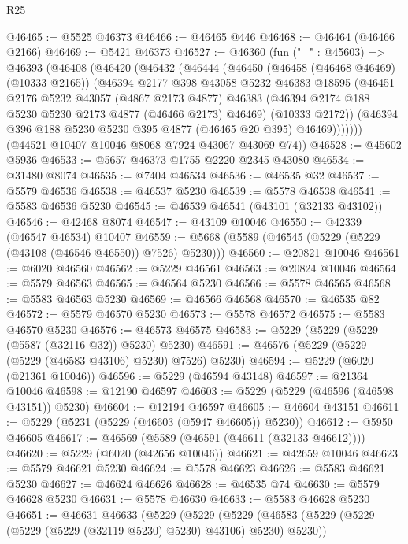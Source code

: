 \begin{lexlean}{R25}
\begin{coremodule}
@46465 := @5525 @46373
@46466 := @46465 @446
@46468 := @46464 (@46466 @2166)
@46469 := @5421 @46373
@46527 := @46360
    (fun ("_" : @45603) =>
    @46393
      (@46408
        (@46420
          (@46432
            (@46444
              (@46450
                (@46458 (@46468 @46469) (@10333 @2165))
                (@46394
                  @2177
                  @398
                  @43058
                  @5232
                  @46383
                  @18595
                  (@46451
                    @2176
                    @5232
                    @43057
                    (@4867 @2173 @4877)
                    @46383
                    (@46394 @2174 @188 @5230 @5230 @2173 @4877 (@46466 @2173) @46469)
                    (@10333 @2172))
                  (@46394 @396 @188 @5230 @5230 @395 @4877 (@46465 @20 @395) @46469)))))))
      (@44521 @10407 @10046 @8068 @7924 @43067 @43069 @74))
@46528 := @45602 @5936
@46533 := @5657 @46373 @1755 @2220 @2345 @43080
@46534 := @31480 @8074
@46535 := @7404 @46534
@46536 := @46535 @32
@46537 := @5579 @46536
@46538 := @46537 @5230
@46539 := @5578 @46538
@46541 := @5583 @46536 @5230
@46545 := @46539 @46541 (@43101 (@32133 @43102))
@46546 := @42468 @8074
@46547 := @43109 @10046
@46550 := @42339 (@46547 @46534) @10407
@46559 := @5668 (@5589 (@46545 (@5229 (@5229 (@43108 (@46546 @46550)) @7526) @5230)))
@46560 := @20821 @10046
@46561 := @6020 @46560
@46562 := @5229 @46561
@46563 := @20824 @10046
@46564 := @5579 @46563
@46565 := @46564 @5230
@46566 := @5578 @46565
@46568 := @5583 @46563 @5230
@46569 := @46566 @46568
@46570 := @46535 @82
@46572 := @5579 @46570 @5230
@46573 := @5578 @46572
@46575 := @5583 @46570 @5230
@46576 := @46573 @46575
@46583 := @5229 (@5229 (@5229 (@5587 (@32116 @32)) @5230) @5230)
@46591 := @46576 (@5229 (@5229 (@5229 (@46583 @43106) @5230) @7526) @5230)
@46594 := @5229 (@6020 (@21361 @10046))
@46596 := @5229 (@46594 @43148)
@46597 := @21364 @10046
@46598 := @12190 @46597
@46603 := @5229 (@5229 (@46596 (@46598 @43151)) @5230)
@46604 := @12194 @46597
@46605 := @46604 @43151
@46611 := @5229 (@5231 (@5229 (@46603 (@5947 @46605)) @5230))
@46612 := @5950 @46605
@46617 := @46569 (@5589 (@46591 (@46611 (@32133 @46612))))
@46620 := @5229 (@6020 (@42656 @10046))
@46621 := @42659 @10046
@46623 := @5579 @46621 @5230
@46624 := @5578 @46623
@46626 := @5583 @46621 @5230
@46627 := @46624 @46626
@46628 := @46535 @74
@46630 := @5579 @46628 @5230
@46631 := @5578 @46630
@46633 := @5583 @46628 @5230
@46651 := @46631
    @46633
    (@5229
      (@5229
        (@5229
          (@46583 (@5229 (@5229 (@5229 (@5229 (@32119 @5230) @5230) @43106) @5230) @5230))

\end{coremodule}
\end{lexlean}
